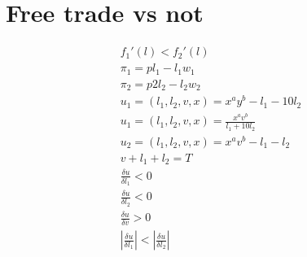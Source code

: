 \documentclass[12pt]{article}
\begin{document}
\section{Free trade vs not}

\begin{align*}
	f_1'(l) < f_2'(l) \\
	\pi_1 = p l_1 - l_1 w_1 \\
	\pi_2 = p2l_2 - l_2 w_2 \\
	u_1 = (l_1,l_2,v,x) = x^{a}y^{b} - l_1 -10l_2  \\
	u_1 = (l_1,l_2,v,x) = \frac{x^{a}v^{b}}{l_1 + 10l_2}  \\
	u_2 = (l_1,l_2,v,x) = x^{a}v^{b} - l_1 -l_2  \\
	v + l_1 + l_2 = T \\
	\frac{\delta u}{\delta l_1}<0 \\
	\frac{\delta u}{\delta l_2}<0 \\
	\frac{\delta u}{\delta v} > 0 \\
	|\frac{\delta u}{\delta l_1}|<|\frac{\delta u}{\delta l_2}| \\
\end{align*}
\end{document}
